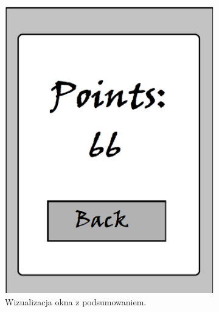 \documentclass[15pt]{article}
\begin{document}
  
  \begin{figure}[h!]
    \centering
    \begin{subfigure}[b]{0.35\linewidth}
      \includegraphics[width=\linewidth]{points.png}
      \caption{Wizualizacja okna z podsumowaniem.}
    \end{subfigure}
    \begin{subfigure}[b]{0.35\linewidth}

\end{subfigure}
\end{figure}
\end{document}
